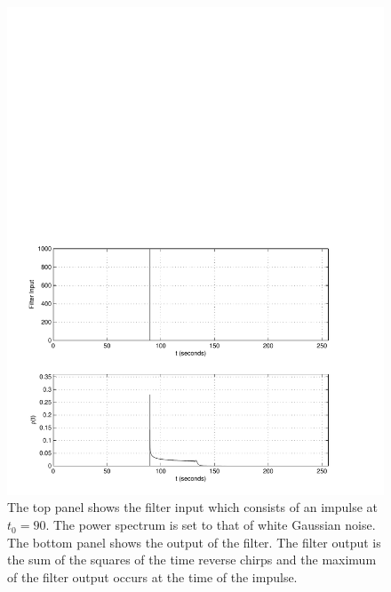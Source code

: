 \begin{figure}[htb]
\label{f:impuse_snr}
\begin{center}
\includegraphics[width=\linewidth]{figures/findchirp/impulse_snr}
\end{center}
\caption{%
The top panel shows the filter input which consists of an impulse at $t_0 = 90$.
The power spectrum is set to that of white Gaussian noise. The bottom panel
shows the output of the filter. The filter output is the sum of the squares of
the time reverse chirps and the maximum of the filter output occurs at the
time of the impulse.
}
\end{figure}

